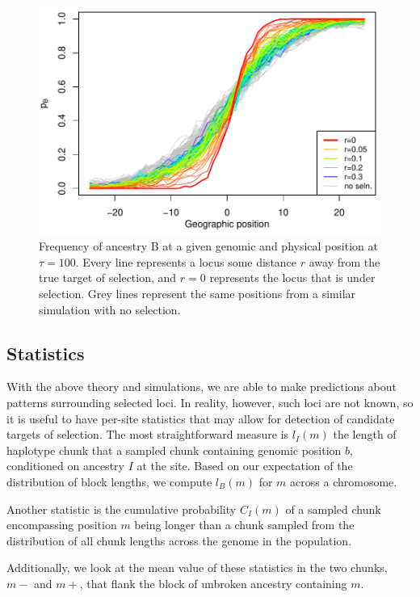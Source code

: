\documentclass[12pt]{article}
\begin{document}
\begin{figure}
\includegraphics{figs/alleleFrequencies_sim}
\caption{Frequency of ancestry B at a given genomic and physical position at $\tau=100$. Every line represents a locus some distance $r$ away from the true target of selection, and $r=0$ represents the locus that is under selection. Grey lines represent the same positions from a similar simulation with no selection.}\label{alleleFreq_tau100}
\end{figure}

\subsection*{Statistics}
With the above theory and simulations, we are able to make predictions about patterns surrounding selected loci. In reality, however, such loci are not known, so it is useful to have per-site statistics that may allow for detection of candidate targets of selection. The most straightforward measure is $l_I(m)$ the length of haplotype chunk that a sampled chunk containing genomic position $b$, conditioned on ancestry $I$ at the site. Based on our expectation of the distribution of block lengths, we compute $l_B(m)$ for $m$ across a chromosome. 

Another statistic is the cumulative probability $C_I(m)$ of a sampled chunk encompassing position $m$ being longer than a chunk sampled from the distribution of all chunk lengths across the genome in the population. 

Additionally, we look at the mean value of these statistics in the two chunks, $m-$ and $m+$, that flank the block of unbroken ancestry containing $m$.
\end{document}
